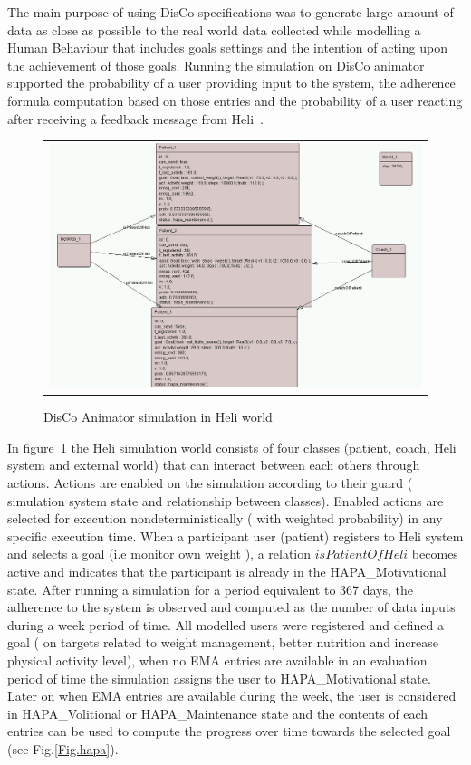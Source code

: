 \documentclass[graybox]{svmult}
\begin{document}
The main purpose of using DisCo specifications was to generate large amount of data as close as possible to the real world data collected while modelling a Human Behaviour that includes goals settings and the intention of acting upon the achievement of those goals. Running the simulation on DisCo animator supported the probability of a user providing input to the system, the adherence formula computation based on those entries and the probability of a user reacting after receiving a feedback message from Heli~\cite{rem2017}.
 
\begin{figure}
  \begin{center}
  \begin{tabular}{c}
    \includegraphics[scale=0.3]{DisCoAnimator.png}\\
    \end{tabular}
    \caption{DisCo Animator simulation in Heli world}
     \label{Fig.Animator}
\end{center}
\end{figure} 

In figure~\ref{Fig.Animator} the Heli simulation world consists of  four classes (patient, coach, Heli system and external world) that  can interact between each others through actions. Actions are enabled on the simulation according to their guard ( simulation system state and relationship between classes). Enabled actions are selected  for execution nondeterministically ( with weighted probability) in any specific execution time. When a participant user (patient) registers to Heli system and selects a goal (i.e monitor own weight ),  a relation $isPatientOfHeli$ becomes active and indicates that the participant is already in the HAPA\_Motivational state. After running a simulation for a period equivalent to 367 days, the adherence to the system is observed and computed as the number of data inputs during a week period of time.  All modelled users were registered and defined a goal ( on targets related to weight management, better nutrition and increase physical activity level), when no EMA entries are available in an evaluation period of time the simulation assigns the user to HAPA\_Motivational state. Later on when EMA entries are available during the week, the user is considered in HAPA\_Volitional or HAPA\_Maintenance state and the contents of each entries can be used to compute the progress over time towards the selected goal (see Fig.\ref{Fig.hapa}).
\end{document}
